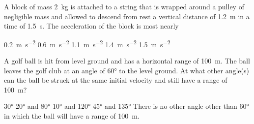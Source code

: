 \documentclass{../../../oss-ap12ibhl}
\begin{document}
\begin{questions}
  \question A block of mass \SI{2}{\kilo\gram} is attached to a string that is
  wrapped around a pulley of negligible mass and allowed to descend from rest
  a vertical distance of \SI{1.2}{\metre} in a time of \SI{1.5}{\second}. The
  acceleration of the block is most nearly

  \begin{minipage}{.28\linewidth}
  \end{minipage}
  \begin{minipage}{.3\linewidth}
    \begin{choices}
      \choice\SI{0.2}{\metre\per\second\squared}
      \choice\SI{.6} {\metre\per\second\squared}
      \choice\SI{1.1}{\metre\per\second\squared}
      \choice\SI{1.4}{\metre\per\second\squared}
      \choice\SI{1.5}{\metre\per\second\squared}
    \end{choices}
  \end{minipage}

%  
  
  \question A golf ball is hit from level ground and has a horizontal range of
  \SI{100}{\metre}. The ball leaves the golf club at an angle of \ang{60} to
  the level ground. At what other angle(s) can the ball be struck at the same
  initial velocity and still have a range of \SI{100}{\metre}?

  \begin{minipage}{.38\linewidth}
  \end{minipage}
  \begin{minipage}{.61\linewidth}
    \begin{choices}
      \choice\ang{30}
      \choice\ang{20} and \ang{80}
      \choice\ang{10} and \ang{120}
      \choice\ang{45} and \ang{135}
      \choice There is no other angle other than \ang{60} in which the ball
      will have a range of \SI{100}{\metre}.
    \end{choices}
  \end{minipage}
  \newpage
  

\end{questions}
\end{document}
